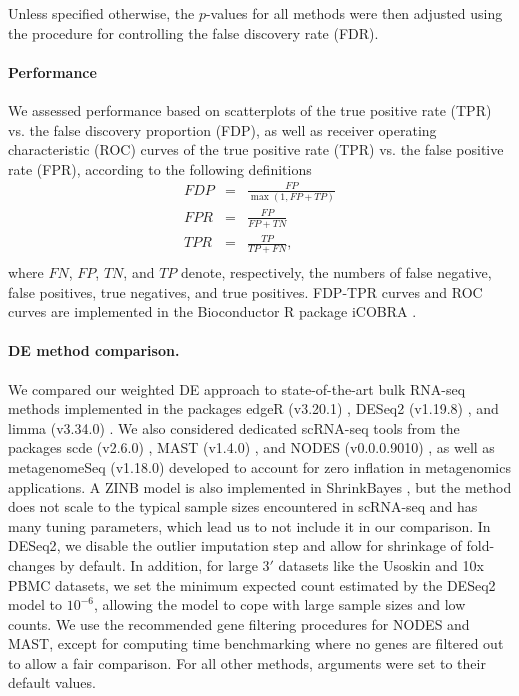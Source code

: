 \documentclass{bmcart}
\newcommand{\RPack}[1]{\textsf{#1}}
\begin{document}
Unless specified otherwise, the $p$-values for all methods were then adjusted using the \citet{Benjamini1995} procedure for controlling the false discovery rate (FDR). 


\paragraph{Performance} 
We assessed performance based on scatterplots of the true positive rate (TPR) vs. the false discovery proportion (FDP), as well as receiver operating characteristic (ROC) curves of the true positive rate (TPR) vs. the false positive rate (FPR), according to the following definitions
\begin{eqnarray*}
FDP &=& \frac{FP}{\max(1,FP + TP)}\\
FPR &=& \frac{FP}{FP + TN}\\
TPR &=& \frac{TP}{TP + FN},\\
\end{eqnarray*}
where $FN$, $FP$, $TN$, and $TP$ denote, respectively, the numbers of false negative, false positives, true negatives, and true positives. FDP-TPR curves and ROC curves are implemented in the Bioconductor R package \RPack{iCOBRA} \citep{Soneson2016b}.

\paragraph{DE method comparison.}
We compared our weighted DE approach to state-of-the-art bulk RNA-seq methods implemented in the packages \RPack{edgeR} (v3.20.1) \citep{Robinson2010a,McCarthy2012a}, \RPack{DESeq2} (v1.19.8) \citep{Love2014}, and \RPack{limma} (v3.34.0) \citep{Law2014}. We also considered dedicated scRNA-seq tools from the packages \RPack{scde} (v2.6.0) \citep{Kharchenko2014}, \RPack{MAST} (v1.4.0) \citep{Finak2015}, and \RPack{NODES} (v0.0.0.9010) \citep{Sengupta2016}, as well as \RPack{metagenomeSeq} (v1.18.0) \citep{Paulson2013} developed to account for zero inflation in metagenomics applications. A ZINB model is also implemented in \RPack{ShrinkBayes} \citep{VandeWiel2014}, but the method does not scale to the typical sample sizes encountered in scRNA-seq and has many tuning parameters, which lead us to not include it in our comparison. In \RPack{DESeq2}, we disable the outlier imputation step and allow for shrinkage of fold-changes by default. In addition, for large $3'$ datasets like the Usoskin and 10x PBMC datasets, we set the minimum expected count estimated by the \RPack{DESeq2} model to $10^{-6}$, allowing the model to cope with large sample sizes and low counts. We use the recommended gene filtering procedures for \RPack{NODES} and \RPack{MAST}, except for computing time benchmarking where no genes are filtered out to allow a fair comparison. For all other methods, arguments were set to their default values. 
% 
% 
% 
% 
\end{document}
